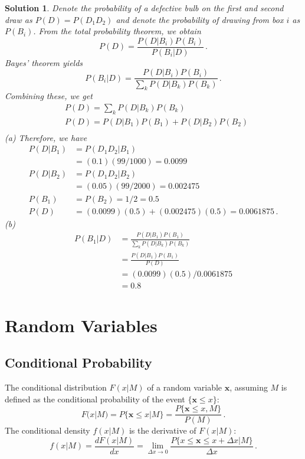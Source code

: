 \documentclass{article}
\newtheorem{solution}{Solution}[section]
\begin{document}
		\begin{solution}
			Denote the probability of a defective bulb on the first and second draw as $P(D)=P(D_1D_2)$ and denote the probability of drawing from box $i$ as $P(B_i)$. From the total probability theorem, we obtain
			\begin{equation*}
				P(D)=\frac{P(D|B_i)P(B_i)}{P(B_i|D)}\,.
			\end{equation*}
			Bayes' theorem yields
			\begin{equation*}
				P(B_i|D)=\frac{P(D|B_i)P(B_i)}{\sum_k{P(D|B_k)P(B_k)}}\,.
			\end{equation*}
			Combining these, we get
			\begin{align*}
				&P(D)=\sum_k{P(D|B_k)P(B_k)}\\
				&P(D)=P(D|B_1)P(B_1)+P(D|B_2)P(B_2)\\
			\end{align*}
			(a) Therefore, we have
			\begin{align*}
				P(D|B_1)&=P(D_1D_2|B_1)\\
				&=(0.1)(99/1000)=0.0099\\
				P(D|B_2)&=P(D_1D_2|B_2)\\
				&=(0.05)(99/2000)=0.002475\\
				P(B_1)&=P(B_2)=1/2=0.5\\
				P(D)&=(0.0099)(0.5)+(0.002475)(0.5)=0.0061875\,.
			\end{align*}
			(b)
			\begin{align*}
				P(B_1|D)&=\frac{P(D|B_1)P(B_1)}{\sum_k{P(D|B_k)P(B_k)}}\\
				&=\frac{P(D|B_1)P(B_1)}{P(D)}\\
				&=(0.0099)(0.5)/0.0061875\\
				&=0.8
			\end{align*}			
		\end{solution}
	\section{Random Variables}
		\subsection{Conditional Probability}
			The conditional distribution $F(x|M)$ of a random variable $\mathbf{x}$, assuming $M$ is defined as the conditional probability of the event $\{\mathbf{x}\leq x\}$:
			\begin{equation}
				F(x|M)=P\{\mathbf{x}\leq x|M\}=\frac{P\{\mathbf{x}\leq x,M\}}{P(M)}\,.
			\end{equation}
			The conditional density $f(x|M)$ is the derivative of $F(x|M)$:
			\begin{equation}
				f(x|M)=\frac{dF(x|M)}{dx}=\lim_{\Delta x\rightarrow 0}{\frac{P\{x\leq\mathbf{x}\leq x+\Delta x|M\}}{\Delta x}}\,.
			\end{equation}
\end{document}
